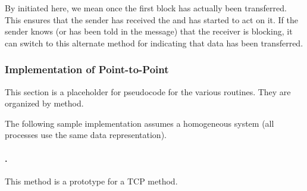 By initiated here, we mean once the first block has actually been
transferred.  This ensures that the sender has received the
 and has started to act on it.  If the sender
knows (or has been told in the  message) that
the receiver is blocking, it can switch to this alternate method for
indicating that data has been transferred.

\clearpage

\subsubsection{Implementation of Point-to-Point}
\label{sec:pt2pt-implementation}
This section is a placeholder for pseudocode for the various routines.  They
are organized by method.

The following sample implementation assumes a homogeneous system (all
processes use the same data representation).  

\paragraph{\tcpname.}
This method is a prototype for a TCP method.  


